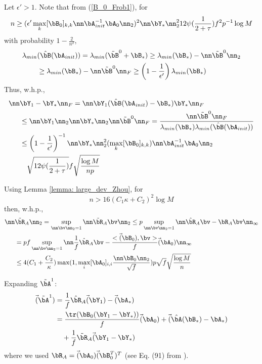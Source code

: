 \begin{IEEEproof}
Let $\epsilon'>1$. Note that from (\ref{B_0_Frob1}), for
\begin{equation} \label{cond_1}
	n\geq (\epsilon' \max_k [\bB_0]_{k,k} \nn\bA_{init}^{-1}\bA_0\nn_2)^2 \nn\bY_*\nn_2^2 12 \psi(\frac{1}{2+\tau}) f^2 p^{-1} \log M
\end{equation}
with probability $1-\frac{2}{n^2}$,
\begin{align*}
	\lambda_{min} &(\hat{\bB}(\bA_{init})) = \lambda_{min}(\tilde{\bB}^0 + \bB_*) \geq \lambda_{min}(\bB_*) - \nn \tilde{\bB}^0 \nn_2 \\
		&\geq \lambda_{min}(\bB_*) - \nn \tilde{\bB}^0 \nn_F \geq \left( 1-\frac{1}{\epsilon'} \right) \lambda_{min}(\bB_*)
\end{align*}
Thus, w.h.p.,
\begin{align}
	\nn & \bY_1-\bY_* \nn_F = \nn \bY_1 (\hat{\bB}(\bA_{init})-\bB_*) \bY_* \nn_F \nonumber \\ 
		&\leq \nn \bY_1 \nn_2 \nn \bY_* \nn_2 \nn \tilde{\bB}^0 \nn_F = \frac{\nn \tilde{\bB}^0 \nn_F}{ \lambda_{min}(\bB_*) \lambda_{min}(\hat{\bB}(\bA_{init})) } \nonumber \\
		&\leq \left( 1-\frac{1}{\epsilon'} \right)^{-1} \nn\bY_*\nn_2^2 (\max_k [\bB_0]_{k,k}) \nn \bA_{init}^{-1} \bA_0\nn_2 \nonumber \\
		&\quad \sqrt{12 \psi(\frac{1}{2+\tau})} f \sqrt{\frac{\log M}{np}} \label{bound_Frob_spec}
\end{align}


Using Lemma \ref{lemma: large_dev_Zhou}, for 
\begin{equation} \label{cond_2}
	n>16 (C_1 \kappa + C_2)^2 \log M
\end{equation}
then, w.h.p.,
\begin{align}
	\nn & \tilde{\bR}_A\nn_2 = \sup_{\nn \bv \nn_2=1} \nn \tilde{\bR}_A \bv \nn_2 \leq p \sup_{\nn \bv \nn_2 = 1} \nn \hat{\bR}_A \bv - \bR_A \bv \nn_\infty \nonumber \\
		&= pf \sup_{\nn \bv \nn_2 = 1} \nn \frac{1}{f} \hat{\bR}_A \bv - \frac{<\vec(\bB_0),\bv>}{f} \vec(\bA_0) \nn_\infty \nonumber \\
		&\leq 4 (C_1 + \frac{C_2}{\kappa}) \max(1,\max_i [\bA_0]_{i,i} \frac{\nn \bB_0\nn_2}{\sqrt{f}}) p\sqrt{f} \sqrt{\frac{\log M}{n}} \label{bound_mixed_norm2}
\end{align}

Expanding $\tilde{\bA}^1$:
\begin{align}
	\vec(\tilde{\bA}^1) &= \frac{1}{f} \hat{\bR}_A \vec(\bY_1) - \vec(\bA_*) \nonumber \\
		&= \frac{\tr(\bB_0(\bY_1-\bY_*))}{f} \vec(\bA_0) + \vec(\hat{\bA}(\bB_*)-\bA_*) \nonumber \\
		&\quad + \frac{1}{f} \tilde{\bR}_A \vec(\bY_1-\bY_*) \label{A_1_error2}
\end{align}
where we used $\bR_A = \vec(\bA_0)\vec(\bB_0^T)^T$ (see Eq. (91) from \cite{EstCovMatKron}).


\end{IEEEproof}
